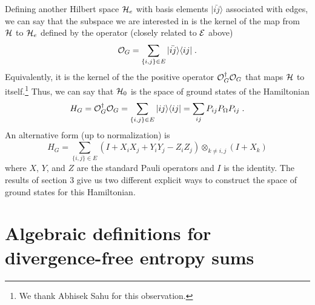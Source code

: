\documentclass[12pt]{article}
\theoremstyle{definition}
\begin{document}
Defining another Hilbert space ${\cal H}_e$ with basis elements $|\bar{ij} \rangle$ associated with edges, we can say that the subspace we are interested in is the kernel of the map from ${\cal H}$ to ${\cal H}_e$ defined by the operator (closely related to ${\cal E}$ above)
\[
{\cal O}_G = \sum_{\{i,j\} \in E}|\bar{ij} \rangle \langle ij| \; .
\]
Equivalently, it is the kernel of the the positive operator ${\cal O}_G^\dagger {\cal O}_G$ that maps ${\cal H}$ to itself.\footnote{We thank Abhisek Sahu for this observation.} Thus, we can say that ${\cal H}_0$ is the space of ground states of the Hamiltonian
\[
H_G = {\cal O}_G^\dagger {\cal O}_G  =  \sum_{\{i,j\} \in E} |ij \rangle \langle ij | = \sum_{ij} P_{ij} P_{\Omega} P_{ij}  \; .
\]
An alternative form (up to normalization) is 
\[
H_G =  \sum_{\{i,j\} \in E} (I + X_i X_j + Y_i Y_j - Z_i Z_j) \otimes_{k \ne i,j} (I + X_k)
\]
where $X$, $Y$, and $Z$ are the standard Pauli operators and $I$ is the identity. The results of section 3 give us two different explicit ways to construct the space of ground states for this Hamiltonian.



\section{Algebraic definitions for divergence-free entropy sums}
\end{document}

